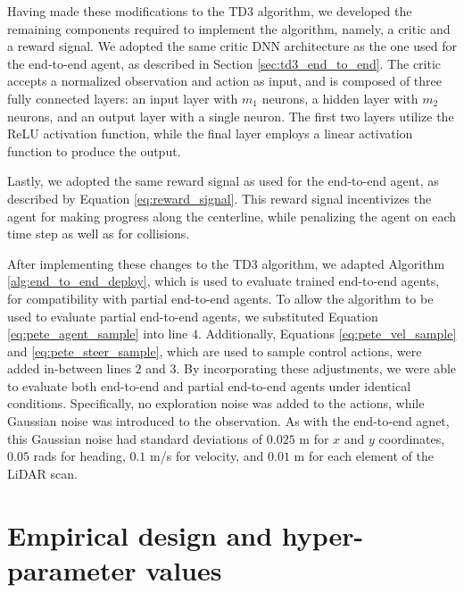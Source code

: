 Having made these modifications to the TD3 algorithm, we developed the remaining components required to implement the algorithm, namely, a critic and a reward signal.
We adopted the same critic DNN architecture as the one used for the end-to-end agent, as described in Section \ref{sec:td3_end_to_end}. 
The critic accepts a normalized observation and action as input, and is composed of three fully connected layers: an input layer with $m_1$ neurons, a hidden layer with $m_2$ neurons, and an output layer with a single neuron. The first two layers utilize the ReLU activation function, while the final layer employs a linear activation function to produce the output. 

Lastly, we adopted the same reward signal as used for the end-to-end agent, as described by Equation \ref{eq:reward_signal}. 
This reward signal incentivizes the agent for making progress along the centerline, while penalizing the agent on each time step as well as for collisions.


After implementing these changes to the TD3 algorithm, we adapted Algorithm \ref{alg:end_to_end_deploy}, which is used to evaluate trained end-to-end agents, for compatibility with partial end-to-end agents.
To allow the algorithm to be used to evaluate partial end-to-end agents, we substituted Equation \ref{eq:pete_agent_sample} into line $4$.
Additionally, Equations \ref{eq:pete_vel_sample} and \ref{eq:pete_steer_sample}, which are used to sample control actions, were added in-between lines $2$ and $3$.
By incorporating these adjustments, we were able to evaluate both end-to-end and partial end-to-end agents under identical conditions. 
Specifically, no exploration noise was added to the actions, while Gaussian noise was introduced to the observation.
As with the end-to-end agnet, this Gaussian noise had standard deviations of $0.025$ m for $x$ and $y$ coordinates, $0.05$ rads for heading, $0.1$ m/s for velocity, and $0.01$ m for each element of the LiDAR scan. 













\section{Empirical design and hyper-parameter values}

